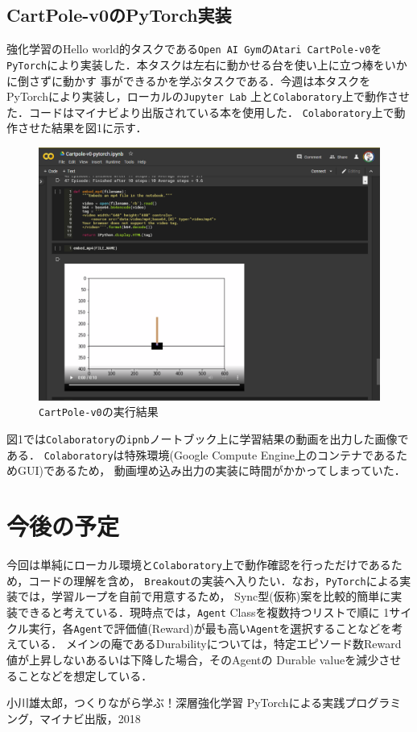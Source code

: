 \documentclass[11pt,a4paper]{jsarticle}
\begin{document}
\subsection{CartPole-v0のPyTorch実装}
強化学習のHello world的タスクである\texttt{Open AI Gym}の\texttt{Atari CartPole-v0}を
\texttt{PyTorch}により実装した．本タスクは左右に動かせる台を使い上に立つ棒をいかに倒さずに動かす
事ができるかを学ぶタスクである．今週は本タスクをPyTorchにより実装し，ローカルの\texttt{Jupyter Lab}
上と\texttt{Colaboratory}上で動作させた．コードはマイナビより出版されている本\cite{book1}を使用した．
\texttt{Colaboratory}上で動作させた結果を図1に示す．
\begin{figure}[htbp]
  \begin{center}
    \includegraphics[width=14cm]{fig1.png}
    \caption{\texttt{CartPole-v0}の実行結果}
  \end{center}
  \label{fig1}
\end{figure}
図1では\texttt{Colaboratory}の\texttt{ipnb}ノートブック上に学習結果の動画を出力した画像である．
\texttt{Colaboratory}は特殊環境(Google Compute Engine上のコンテナであるためGUI)であるため，
動画埋め込み出力の実装に時間がかかってしまっていた．


\section{今後の予定}
今回は単純にローカル環境と\texttt{Colaboratory}上で動作確認を行っただけであるため，コードの理解を含め，
\texttt{Breakout}の実装へ入りたい．なお，\texttt{PyTorch}による実装では，学習ループを自前で用意するため，
Sync型(仮称)案を比較的簡単に実装できると考えている．現時点では，\texttt{Agent} Classを複数持つリストで順に
1サイクル実行，各\texttt{Agent}で評価値(Reward)が最も高い\texttt{Agent}を選択することなどを考えている．
メインの庵であるDurabilityについては，特定エピソード数Reward値が上昇しないあるいは下降した場合，そのAgentの
Durable valueを減少させることなどを想定している．

\begin{thebibliography}{1}
   小川雄太郎，つくりながら学ぶ！深層強化学習 PyTorchによる実践プログラミング，マイナビ出版，2018
\end{thebibliography}
\end{document}

